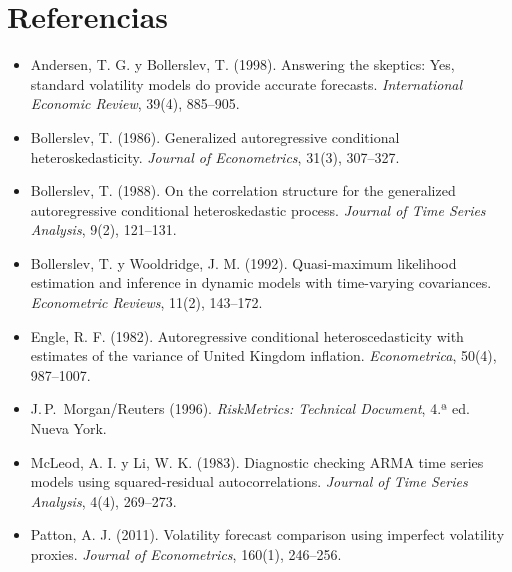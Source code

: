 \section*{Referencias}
\begin{itemize}[leftmargin=*]
  \item Andersen, T. G. y Bollerslev, T. (1998). Answering the skeptics: Yes, standard volatility models do
        provide accurate forecasts. \emph{International Economic Review}, 39(4), 885--905.
  \item Bollerslev, T. (1986). Generalized autoregressive conditional heteroskedasticity. \emph{Journal of
        Econometrics}, 31(3), 307--327.
  \item Bollerslev, T. (1988). On the correlation structure for the generalized autoregressive conditional
        heteroskedastic process. \emph{Journal of Time Series Analysis}, 9(2), 121--131.
  \item Bollerslev, T. y Wooldridge, J. M. (1992). Quasi-maximum likelihood estimation and inference in dynamic
        models with time-varying covariances. \emph{Econometric Reviews}, 11(2), 143--172.
  \item Engle, R. F. (1982). Autoregressive conditional heteroscedasticity with estimates of the variance of
        United Kingdom inflation. \emph{Econometrica}, 50(4), 987--1007.
  \item J.\,P.~Morgan/Reuters (1996). \emph{RiskMetrics: Technical Document}, 4.ª ed. Nueva York.
  \item McLeod, A. I. y Li, W. K. (1983). Diagnostic checking ARMA time series models using squared-residual
        autocorrelations. \emph{Journal of Time Series Analysis}, 4(4), 269--273.
  \item Patton, A. J. (2011). Volatility forecast comparison using imperfect volatility proxies.
        \emph{Journal of Econometrics}, 160(1), 246--256.
\end{itemize}
